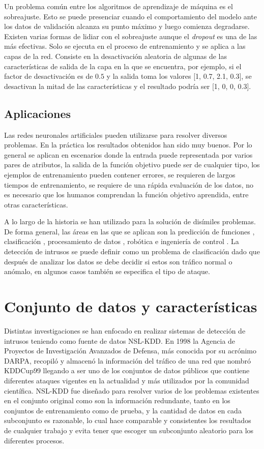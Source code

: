 Un problema común entre los algoritmos de aprendizaje de máquina es el sobreajuste. Esto se puede presenciar cuando el comportamiento del modelo ante los datos de validación alcanza su punto máximo y luego comienza degradarse. Existen varias formas de lidiar con el sobreajuste aunque el \textit{dropout} es una de las más efectivas. Solo se ejecuta en el proceso de entrenamiento y se aplica a las capas de la red. Consiste en la desactivaci\'on aleatoria de algunas de las características de salida de la capa en la que se encuentra, por ejemplo, si el factor de desactivaci\'on es de $0.5$ y la salida toma los valores [1, 0.7, 2.1,  0.3], se desactivan la mitad de las características y el resultado podría ser [1, 0, 0, 0.3].

\subsection{Aplicaciones}
Las redes neuronales artificiales pueden utilizarse para resolver diversos problemas. En la práctica los resultados obtenidos han sido muy buenos. Por lo general se aplican en escenarios donde la entrada puede representada por varios pares de atributos, la salida de la función objetivo puede ser de cualquier tipo, los ejemplos de entrenamiento pueden contener errores, se requieren de largos tiempos de entrenamiento, se requiere de una rápida evaluación de los datos, no es necesario que los humanos comprendan la función objetivo aprendida, entre otras características.

A lo largo de la historia se han utilizado para la solución de disímiles problemas. De forma general, las áreas en las que se aplican son la predicción de funciones \cite{naccha2012prediction}, clasificación \cite{lecun1995comparison}, procesamiento de datos \cite{montano2017redes}, robótica \cite{madrigal2002robots} e ingeniería de control \cite{forero2013control}. La detección de intrusos se puede definir como un problema de clasificación dado que después de analizar los datos se debe decidir si estos son tráfico normal o anómalo, en algunos casos también se especifica el tipo de ataque.

\section{Conjunto de datos y características}
Distintas investigaciones se han enfocado en realizar sistemas de detección de intrusos teniendo como fuente de datos NSL-KDD. En 1998 la Agencia de Proyectos de Investigación Avanzados de Defensa, más conocida por su acrónimo DARPA, recopiló y almacenó la información del tráfico de una red que nombró KDDCup99 llegando a ser uno de los conjuntos de datos públicos que contiene diferentes ataques vigentes en la actualidad y más utilizados por la comunidad científica. NSL-KDD fue diseñado para resolver varios de los problemas existentes en el conjunto original como son la información redundante, tanto en los conjuntos de entrenamiento como de prueba, y la cantidad de datos en cada subconjunto es razonable, lo cual hace comparable y consistentes los resultados de cualquier trabajo y evita tener que escoger un subconjunto aleatorio para los diferentes procesos.

